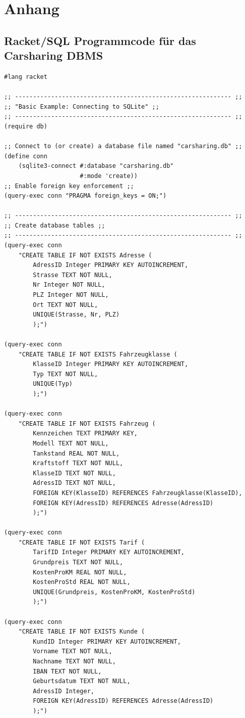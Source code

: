 \section{Anhang}
\label{section:appendix}
\subsection{Racket/SQL Programmcode für das Carsharing DBMS}
\label{subsec:SQLcode}
\begin{lstlisting}[language=racketSQL]
#lang racket

;; ------------------------------------------------------------ ;;
;; "Basic Example: Connecting to SQLite" ;;
;; ------------------------------------------------------------ ;;
(require db)

;; Connect to (or create) a database file named "carsharing.db" ;;
(define conn
	(sqlite3-connect #:database "carsharing.db"
					 #:mode 'create))
;; Enable foreign key enforcement ;;
(query-exec conn "PRAGMA foreign_keys = ON;")

;; ------------------------------------------------------------ ;;
;; Create database tables ;; 
;; ------------------------------------------------------------ ;;
(query-exec conn
	"CREATE TABLE IF NOT EXISTS Adresse (
		AdressID Integer PRIMARY KEY AUTOINCREMENT,
		Strasse TEXT NOT NULL,
		Nr Integer NOT NULL,
		PLZ Integer NOT NULL,
		Ort TEXT NOT NULL,
		UNIQUE(Strasse, Nr, PLZ)
		);")

(query-exec conn
	"CREATE TABLE IF NOT EXISTS Fahrzeugklasse (
		KlasseID Integer PRIMARY KEY AUTOINCREMENT,
		Typ TEXT NOT NULL,
		UNIQUE(Typ)
		);")

(query-exec conn
	"CREATE TABLE IF NOT EXISTS Fahrzeug (
		Kennzeichen TEXT PRIMARY KEY,
		Modell TEXT NOT NULL,
		Tankstand REAL NOT NULL,
		Kraftstoff TEXT NOT NULL,
		KlasseID TEXT NOT NULL,
		AdressID TEXT NOT NULL,
		FOREIGN KEY(KlasseID) REFERENCES Fahrzeugklasse(KlasseID),
		FOREIGN KEY(AdressID) REFERENCES Adresse(AdressID)
		);")

(query-exec conn
	"CREATE TABLE IF NOT EXISTS Tarif (
		TarifID Integer PRIMARY KEY AUTOINCREMENT,
		Grundpreis TEXT NOT NULL,
		KostenProKM REAL NOT NULL,
		KostenProStd REAL NOT NULL,
		UNIQUE(Grundpreis, KostenProKM, KostenProStd)
		);")

(query-exec conn
	"CREATE TABLE IF NOT EXISTS Kunde (
		KundID Integer PRIMARY KEY AUTOINCREMENT,
		Vorname TEXT NOT NULL,
		Nachname TEXT NOT NULL,
		IBAN TEXT NOT NULL,
		Geburtsdatum TEXT NOT NULL,
		AdressID Integer,
		FOREIGN KEY(AdressID) REFERENCES Adresse(AdressID)
		);")


\end{lstlisting}
